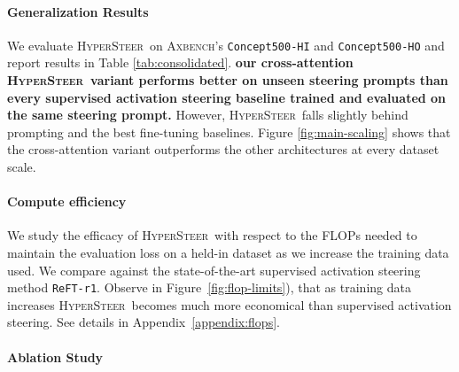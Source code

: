 \documentclass[11pt]{article}
\newcommand{\methodname}{\textsc{HyperSteer}}
\begin{document}
\paragraph{Generalization Results}
We evaluate \methodname\ on \textsc{Axbench}'s \texttt{Concept500-HI} and \texttt{Concept500-HO} and report results in Table \ref{tab:consolidated}. \textbf{our cross-attention \methodname\ variant performs better on unseen steering prompts than every supervised activation steering baseline trained and evaluated on the same steering prompt.} However, \methodname\ falls slightly behind prompting and the best fine-tuning baselines.
Figure \ref{fig:main-scaling} shows that the cross-attention variant outperforms the other architectures at every dataset scale.

\paragraph{Compute efficiency}
We study the efficacy of \methodname\ with respect to the FLOPs needed to maintain the evaluation loss on a held-in dataset as we increase the training data used. We compare against the state-of-the-art supervised activation steering method \texttt{ReFT-r1}. Observe in Figure~\ref{fig:flop-limits}), that as training data increases \methodname\ becomes much more economical than supervised activation steering. See details in Appendix~\ref{appendix:flops}.

\paragraph{Ablation Study}
\end{document}
